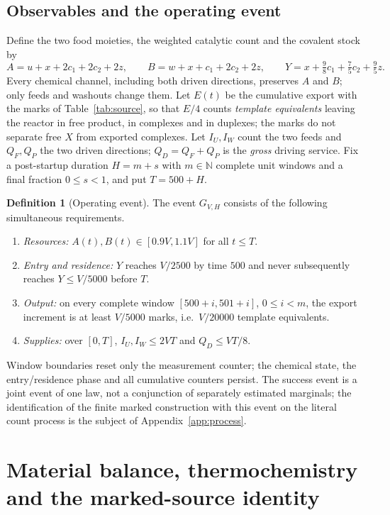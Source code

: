 \documentclass[11pt,a4paper]{article}
\theoremstyle{plain}
\theoremstyle{definition}
\newtheorem{definition}[theorem]{Definition}
\theoremstyle{remark}
\newcommand{\N}{\mathbb N}
\newcommand{\Good}{G_{V,H}}
\begin{document}
\subsection{Observables and the operating event}\label{sec:event}
Define the two food moieties, the weighted catalytic count and the covalent stock by
\begin{equation}\label{eq:observables}
 A=u+x+2c_1+2c_2+2z,\qquad B=w+x+c_1+2c_2+2z,\qquad
 Y=x+\tfrac98c_1+\tfrac75c_2+\tfrac95z .
\end{equation}
Every chemical channel, including both driven directions, preserves $A$ and $B$; only feeds and washouts change them. Let $E(t)$ be the cumulative export with the marks of Table~\ref{tab:source}, so that $E/4$ counts \emph{template equivalents} leaving the reactor in free product, in complexes and in duplexes; the marks do not separate free $X$ from exported complexes. Let $I_U,I_W$ count the two feeds and $Q_F,Q_P$ the two driven directions; $Q_D=Q_F+Q_P$ is the \emph{gross} driving service. Fix a post-startup duration $H=m+s$ with $m\in\N$ complete unit windows and a final fraction $0\le s<1$, and put $T=500+H$.

\begin{definition}[Operating event]\label{def:event}
The event $\Good$ consists of the following simultaneous requirements.
\begin{enumerate}[label=(\alph*)]
\item \emph{Resources:} $A(t),B(t)\in[0.9V,1.1V]$ for all $t\le T$.
\item \emph{Entry and residence:} $Y$ reaches $V/2500$ by time $500$ and never subsequently reaches $Y\le V/5000$ before $T$.
\item \emph{Output:} on every complete window $[500+i,501+i]$, $0\le i<m$, the export increment is at least $V/5000$ marks, i.e.\ $V/20000$ template equivalents.
\item \emph{Supplies:} over $[0,T]$, $I_U,I_W\le2VT$ and $Q_D\le VT/8$.
\end{enumerate}
\end{definition}
Window boundaries reset only the measurement counter; the chemical state, the entry/residence phase and all cumulative counters persist. The success event is a joint event of one law, not a conjunction of separately estimated marginals; the identification of the finite marked construction with this event on the literal count process is the subject of Appendix~\ref{app:process}.

\section{Material balance, thermochemistry and the marked-source identity}\label{sec:realization}
\end{document}
